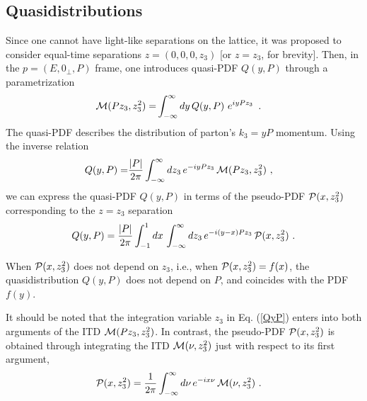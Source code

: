 \documentclass[final,5p,times,twocolumn]{elsarticle}
\begin{document}
  

 \subsection{Quasidistributions} 
Since one cannot have light-like separations on the lattice,
it was proposed  \cite{Ji:2013dva}  to consider 
equal-time  separations  
$z= (0,0,0,z_3)$ [or \mbox{$z=z_3$}, for brevity]. Then, 
 in  the   \mbox{$p=(E, 0_\perp, P)$}  frame,
 one  introduces quasi-PDF  $Q(y, P)$    through a parametrization  
   \begin{align}
  {\cal  M} (Pz_3, z_3^2)   =  & 
   \int_{-\infty}^{\infty}   {dy}   \, Q(y, P)\, 
 \,  e^{i y  P z_3 } \, 
 \  . 
 \label{MyPQ}
\end{align} 
The quasi-PDF  describes  the distribution of  parton's \mbox{$k_3=yP$}  momentum.
Using  the inverse relation 
  \begin{align}
   Q(y, P) =  & \frac{|P|}{2 \pi} 
   \int_{-\infty}^{\infty}   {dz_3}
 \,  e^{-i y  P z_3 } \, 
  {\cal  M} (Pz_3, z_3^2) 
 \  , 
 \label{QyP}
\end{align} 
we can express the quasi-PDF     $Q(y, P)$    in terms of the pseudo-PDF 
$ {\cal   P} (x, z_3^2) $ corresponding to the $z=z_3$ separation 
 \begin{align}
     Q(y,P) =\frac{|P|}{2 \pi}  \int_{-1}^1 dx \,   \int_{-\infty}^\infty dz_3\,
      e^{-i(y-x) Pz_3}\, 
 {\cal   P} (x, z_3^2)  \ . 
  \label{Py}
\end{align} 



When ${\cal   P} (x, z_3^2)$ does not depend on $z_3$, i.e., when
${\cal   P} (x, z_3^2) =f(x)$, the quasidistribution $Q(y,P)$ does not depend on
$P$, and coincides with  the PDF $f(y)$.  



 




It should be noted  that 
 the integration variable $z_3$  in Eq. (\ref{QyP}) enters  into both arguments of the 
ITD $  {\cal  M} (Pz_3, z_3^2) $.  In contrast, the pseudo-PDF 
$ {\cal P} (x, z_3^2) $ is obtained through integrating the ITD  
$ {\cal  M} (\nu, z_3^2)$  just with respect to its first argument, 
  \begin{align}
 {\cal P} (x, z_3^2)   
&   = \frac{1}{2 \pi}  
 \int_{-\infty}^\infty  d\nu
 \, e^{-i x \nu } \,  {\cal  M} (\nu, z_3^2)
  \   .
  \label{PMDx}
\end{align}   
\end{document}
